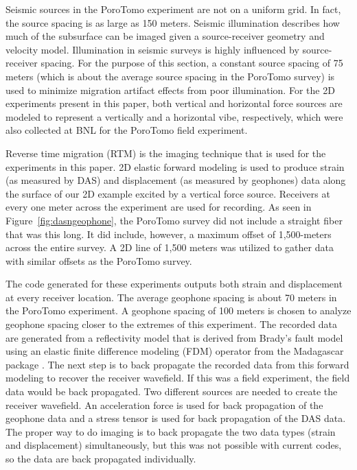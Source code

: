 Seismic sources in the PoroTomo experiment are not on a uniform grid. In fact, the source spacing is as large as 150 meters. Seismic illumination describes how much of the subsurface can be imaged given a source-receiver geometry and velocity model. Illumination in seismic surveys is highly influenced by source-receiver spacing. For the purpose of this section, a constant source spacing of 75 meters (which is about the average source spacing in the PoroTomo survey) is used to minimize migration artifact effects from poor illumination. For the 2D experiments present in this paper, both vertical and horizontal force sources are modeled to represent a vertically and a horizontal vibe, respectively, which were also collected at BNL for the PoroTomo field experiment.

Reverse time migration (RTM) is the imaging technique that is used for the experiments in this paper. 2D elastic forward modeling is used to produce strain (as measured by DAS) and displacement (as measured by geophones) data along the surface of our 2D example excited by a vertical force source. Receivers at every one meter across the experiment are used for recording. As seen in Figure~\ref{fig:dasngeophone}, the PoroTomo survey did not include a straight fiber that was this long. It did include, however, a maximum offset of 1,500-meters across the entire survey. A 2D line of 1,500 meters was utilized to gather data with similar offsets as the PoroTomo survey.

The code generated for these experiments outputs both strain and displacement at every receiver location. The average geophone spacing is about 70 meters in the PoroTomo experiment. A geophone spacing of 100 meters is chosen to analyze geophone spacing closer to the extremes of this experiment. The recorded data are generated from a reflectivity model that is derived from Brady's fault model using an elastic finite difference modeling (FDM) operator from the Madagascar package \citep{fomel2013madagascar}. The next step is to back propagate the recorded data from this forward modeling to recover the receiver wavefield. If this was a field experiment, the field data would be back propagated. Two different sources are needed to create the receiver wavefield. An acceleration force is used for back propagation of the geophone data and a stress tensor is used for back propagation of the DAS data. The proper way to do imaging is to back propagate the two data types (strain and displacement) simultaneously, but this was not possible with current codes, so the data are back propagated individually.

